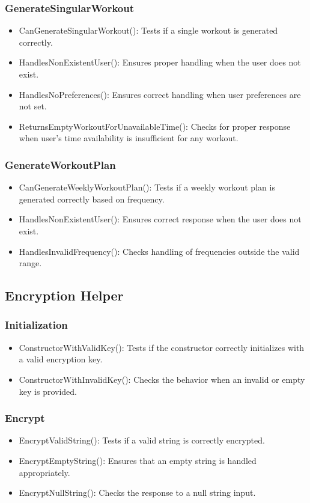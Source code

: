 \documentclass[12pt, titlepage]{article}
\begin{document}
\subsubsection{GenerateSingularWorkout}
\begin{itemize}
    \item CanGenerateSingularWorkout(): Tests if a single workout is generated correctly.
    \item HandlesNonExistentUser(): Ensures proper handling when the user does not exist.
    \item HandlesNoPreferences(): Ensures correct handling when user preferences are not set.
    \item ReturnsEmptyWorkoutForUnavailableTime(): Checks for proper response when user's time availability is insufficient for any workout.
\end{itemize}
\subsubsection{GenerateWorkoutPlan}
\begin{itemize}
    \item CanGenerateWeeklyWorkoutPlan(): Tests if a weekly workout plan is generated correctly based on frequency.
    \item HandlesNonExistentUser(): Ensures correct response when the user does not exist.
    \item HandlesInvalidFrequency(): Checks handling of frequencies outside the valid range.
\end{itemize}

\subsection{Encryption Helper}
\subsubsection{Initialization}
\begin{itemize}
    \item ConstructorWithValidKey(): Tests if the constructor correctly initializes with a valid encryption key.
    \item ConstructorWithInvalidKey(): Checks the behavior when an invalid or empty key is provided.
\end{itemize}
\subsubsection{Encrypt}
\begin{itemize}
    \item EncryptValidString(): Tests if a valid string is correctly encrypted.
    \item EncryptEmptyString(): Ensures that an empty string is handled appropriately.
    \item EncryptNullString(): Checks the response to a null string input.
\end{itemize}
\end{document}
